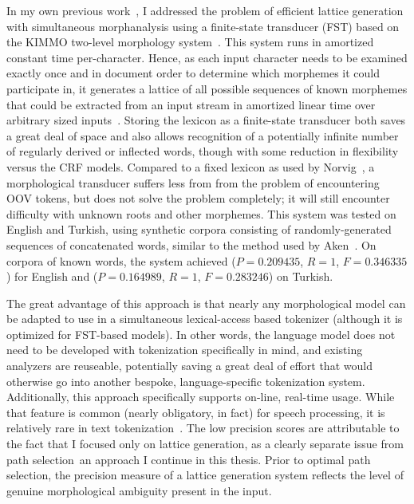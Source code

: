
In my own previous work~\cite{kearsley13}, I addressed the problem of efficient lattice generation with simultaneous morphanalysis using a finite-state transducer (FST) based on the KIMMO two-level morphology system~\cite{koskenniemi84}. This system runs in amortized constant time per-character. Hence, as each input character needs to be examined exactly once and in document order to determine which morphemes it could participate in, it generates a lattice of all possible sequences of known morphemes that could be extracted from an input stream in amortized linear time over arbitrary sized inputs~\cite{kearsley13}. Storing the lexicon as a finite-state transducer both saves a great deal of space and also allows recognition of a potentially infinite number of regularly derived or inflected words, though with some reduction in flexibility versus the CRF models. Compared to a fixed lexicon as used by Norvig~\cite{norvig14}, a morphological transducer suffers less from from the problem of encountering OOV tokens, but does not solve the problem completely; it will still encounter difficulty with unknown roots and other morphemes. This system was tested on English and Turkish, using synthetic corpora consisting of randomly-generated sequences of concatenated words, similar to the method used by Aken~\cite{aken11}. On corpora of known words, the system achieved ($P = 0.209435$, $R = 1$, $F = 0.346335$) for English and ($P = 0.164989$, $R = 1$, $F = 0.283246$) on Turkish.

The great advantage of this approach is that nearly any morphological model can be adapted to use in a simultaneous lexical-access based tokenizer (although it is optimized for FST-based models). In other words, the language model does not need to be developed with tokenization specifically in mind, and existing analyzers are reuseable, potentially saving a great deal of effort that would otherwise go into another bespoke, language-specific tokenization system. Additionally, this approach specifically supports on-line, real-time usage. While that feature is common (nearly obligatory, in fact) for speech processing, it is relatively rare in text tokenization~\cite{aken11}. The low precision scores are attributable to the fact that I focused only on lattice generation, as a clearly separate issue from path selection\textemdash~an approach I continue in this thesis. Prior to optimal path selection, the precision measure of a lattice generation system reflects the level of genuine morphological ambiguity present in the input.

